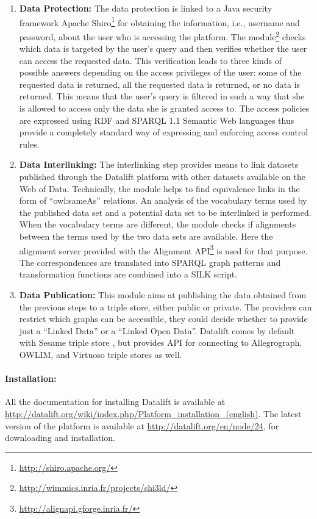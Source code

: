 \begin{enumerate}
\item {\textbf{Data Protection:}}
The data protection is linked to a Java security framework Apache Shiro\footnote{\url{http://shiro.apache.org/}} for obtaining the information, i.e., username and password, about the user who is accessing the platform. The module\footnote{\url{http://wimmics.inria.fr/projects/shi3ld/}} checks which data is targeted by the user's query and then verifies whether the user can access the requested data. This verification leads to three kinds of possible answers depending on the access privileges of the user: some of the requested data is returned, all the requested data is returned, or no data is returned. This means that the user's query is filtered in such a way that she is allowed to access only the data she is granted access to. The access policies are expressed using RDF and SPARQL 1.1 \cite{sparql11} Semantic Web languages thus provide a completely standard way of expressing and enforcing access control rules.

\item{\textbf{Data Interlinking:}}
The interlinking step provides means to link datasets published through the Datalift platform with other datasets available on the Web of Data. Technically, the module helps to find equivalence links in the form of ``owl:sameAs'' relations. An analysis of the vocabulary terms used by the published data set and a potential data set to be interlinked is performed. When the vocabulary terms are different, the module checks if alignments between the terms used by the two data sets are available. Here the alignment server provided with the Alignment API\footnote{\url{http://alignapi.gforge.inria.fr/}} is used for that purpose. The correspondences are translated into SPARQL graph patterns and transformation functions are combined into a SILK script.

\item{\textbf{Data Publication:}}
This module aims at publishing the data obtained from the previous steps to a triple store, either public or private. The providers can restrict which graphs can be accessible, they could decide whether to provide just a ``Linked Data'' or a ``Linked Open Data''. Datalift comes by default with Sesame triple store , but provides API for connecting to Allegrograph, OWLIM, and Virtuoso triple stores as well.
\end{enumerate}


\paragraph{Installation:}
All the documentation for installing Datalift is available at \\\url{http://datalift.org/wiki/index.php/Platform_installation_(english)}. The latest version of the platform is available at \url{http://datalift.org/en/node/24}, for downloading and installation.

